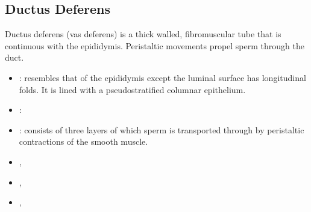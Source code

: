\subsection{Ductus Deferens}
Ductus deferens (vas deferens) is a thick walled, fibromuscular tube that is continuous with the epididymis. Peristaltic movements propel sperm through the duct.
\begin{center}
\end{center}
\begin{multicols}{2}
\begin{itemize}
  \item {}: resembles that of the epididymis except the luminal surface has longitudinal folds. It is lined with a pseudostratified columnar epithelium.
  
  \begin{center}
  \end{center}
  
  \item {}:
  
  \begin{center}
  \end{center}
  
  \item {}: consists of three layers of which sperm is transported through by peristaltic contractions of the smooth muscle.
  
  \begin{center}
  \end{center}
  
  \item {},
  
  \begin{center}
  \end{center}
  
  
  \item {},
  
  \begin{center}
  \end{center}
  
  \item {},
  

\end{itemize}
\end{multicols}
